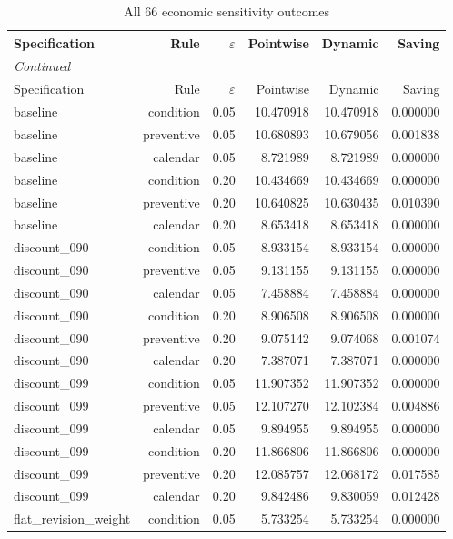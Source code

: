 {\small\setlength{\tabcolsep}{4pt}\begin{longtable}{lrrrrr}
\caption{All 66 economic sensitivity outcomes}\label{tab:all_sensitivity}\\
\toprule
Specification & Rule & $\varepsilon$ & Pointwise & Dynamic & Saving \\
\midrule\endfirsthead
\multicolumn{6}{l}{\emph{Continued}}\\\toprule
Specification & Rule & $\varepsilon$ & Pointwise & Dynamic & Saving \\
\midrule\endhead
baseline & condition & 0.05 & 10.470918 & 10.470918 & 0.000000 \\
baseline & preventive & 0.05 & 10.680893 & 10.679056 & 0.001838 \\
baseline & calendar & 0.05 & 8.721989 & 8.721989 & 0.000000 \\
baseline & condition & 0.20 & 10.434669 & 10.434669 & 0.000000 \\
baseline & preventive & 0.20 & 10.640825 & 10.630435 & 0.010390 \\
baseline & calendar & 0.20 & 8.653418 & 8.653418 & 0.000000 \\
discount\_090 & condition & 0.05 & 8.933154 & 8.933154 & 0.000000 \\
discount\_090 & preventive & 0.05 & 9.131155 & 9.131155 & 0.000000 \\
discount\_090 & calendar & 0.05 & 7.458884 & 7.458884 & 0.000000 \\
discount\_090 & condition & 0.20 & 8.906508 & 8.906508 & 0.000000 \\
discount\_090 & preventive & 0.20 & 9.075142 & 9.074068 & 0.001074 \\
discount\_090 & calendar & 0.20 & 7.387071 & 7.387071 & 0.000000 \\
discount\_099 & condition & 0.05 & 11.907352 & 11.907352 & 0.000000 \\
discount\_099 & preventive & 0.05 & 12.107270 & 12.102384 & 0.004886 \\
discount\_099 & calendar & 0.05 & 9.894955 & 9.894955 & 0.000000 \\
discount\_099 & condition & 0.20 & 11.866806 & 11.866806 & 0.000000 \\
discount\_099 & preventive & 0.20 & 12.085757 & 12.068172 & 0.017585 \\
discount\_099 & calendar & 0.20 & 9.842486 & 9.830059 & 0.012428 \\
flat\_revision\_weight & condition & 0.05 & 5.733254 & 5.733254 & 0.000000 \\

\end{longtable}}
